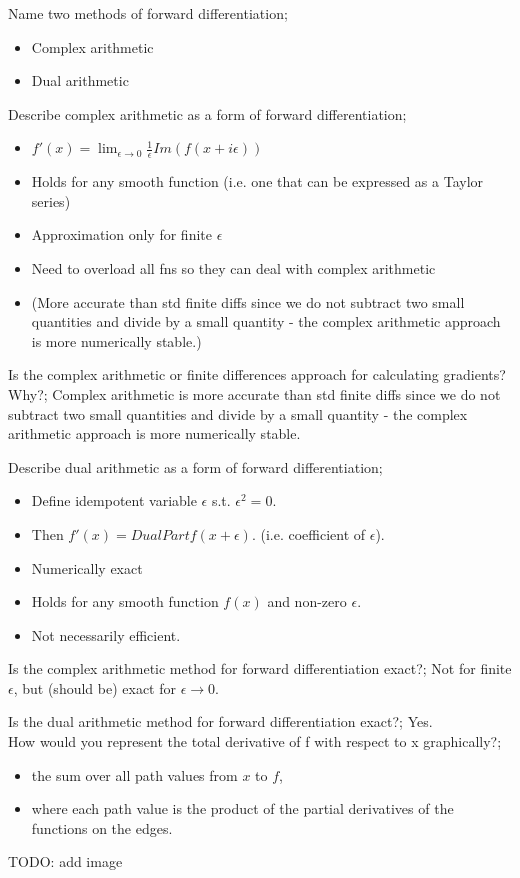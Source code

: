 \documentclass{article}
\begin{document}
Name two methods of forward differentiation; \begin{itemize}
	\item Complex arithmetic
	\item Dual arithmetic
\end{itemize}

Describe complex arithmetic as a form of forward differentiation; \begin{itemize}
	\item $f'(x)=\lim_{\epsilon\rightarrow 0}\frac{1}{\epsilon}Im(f(x+i\epsilon))$
	\item Holds for any smooth function (i.e. one that can be expressed as a Taylor series)
	\item Approximation only for finite $\epsilon$
	\item Need to overload all fns so they can deal with complex arithmetic
	\item (More accurate than std finite diffs since we do not subtract two small quantities and divide by a small quantity - the complex arithmetic approach is more numerically stable.)
\end{itemize}

Is the complex arithmetic or finite differences approach for calculating gradients? Why?; Complex arithmetic is more accurate than std finite diffs since we do not subtract two small quantities and divide by a small quantity - the complex arithmetic approach is more numerically stable.

Describe dual arithmetic as a form of forward differentiation; \begin{itemize}
	\item Define idempotent variable $\epsilon$ s.t. $\epsilon^2 = 0$.
	\item Then $f'(x) = DualPartf(x+\epsilon)$. (i.e. coefficient of $\epsilon$).
	\item Numerically exact
	\item Holds for any smooth function $f(x)$ and non-zero $\epsilon$.
	\item Not necessarily efficient.
\end{itemize}

Is the complex arithmetic method for forward differentiation exact?; Not for finite $\epsilon$, but (should be) exact for $\epsilon\rightarrow 0$.

Is the dual arithmetic method for forward differentiation exact?; Yes.\\

How would you represent the total derivative of f with respect to x graphically?; \begin{itemize}
	\item the sum over all path values from $x$ to $f$, 
	\item where each path value is the product of the partial derivatives of the functions on the edges.
\end{itemize} TODO: add image
\end{document}
